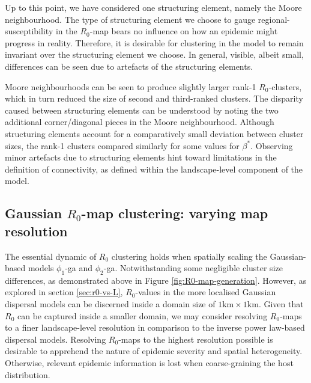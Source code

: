 Up to this point, we have considered one structuring element, namely the Moore neighbourhood.
The type of structuring element we choose to gauge regional-susceptibility in the $R_0$-map bears no influence on how an epidemic might progress in reality.
Therefore, it is desirable for clustering in the model to remain invariant over the structuring element we choose.
In general, visible, albeit small, differences can be seen due to artefacts of the structuring elements.

Moore neighbourhoods can be seen to produce slightly larger rank-1 $R_0$-clusters, which in turn reduced the size of second and third-ranked clusters.
The disparity caused between structuring elements can be understood by noting the two additional corner/diagonal pieces in the Moore neighbourhood.
Although structuring elements account for a comparatively small deviation between cluster sizes, the rank-1 clusters compared similarly for some values for $\beta^*$.
Observing minor artefacts due to structuring elements hint toward limitations in the definition of connectivity, as defined within the landscape-level component of the model.

\subsection{Gaussian $R_0$-map clustering: varying map resolution}
\label{sec:gaussian-r0-clustering}

The essential dynamic of $R_0$ clustering holds when spatially scaling the Gaussian-based models $\phi_1$-ga and $\phi_2$-ga.
Notwithstanding some negligible cluster size differences, as demonstrated above in Figure \ref{fig:R0-map-generation}.
However, as explored in section \ref{sec:r0-vs-L}, $R_0$-values in the more localised Gaussian dispersal models can be discerned inside a domain size of $\mathrm{1km \times 1km}$.
Given that $R_0$ can be captured inside a smaller domain, we may consider resolving $R_0$-maps to a finer landscape-level resolution in comparison to the inverse power law-based dispersal models.
Resolving $R_0$-maps to the highest resolution possible is desirable to apprehend the nature of epidemic severity and spatial heterogeneity.
Otherwise, relevant epidemic information is lost when coarse-graining the host distribution. 

